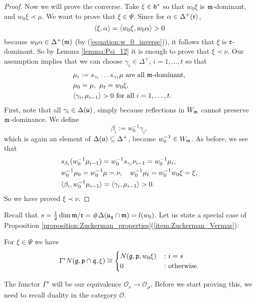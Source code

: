 \documentclass[a4paper,10pt]{article}
\begin{document}
\begin{proof}
Now we will prove the converse. Take $\xi \in \mathfrak{h}^\ast$ so that $w_0 \xi$ is $\mathfrak{m}$-dominant, and $w_0 \xi \prec \mu$. We want to prove that $\xi \in \Psi$. Since for $\alpha \in \Delta^+(\mathfrak{r})$,
%
\[ \langle \xi, \alpha \rangle =  \langle w_0\xi, w_0\alpha \rangle > 0\]
%
because $w_0\alpha \in \Delta^+(\mathfrak{m})$ (by (\ref{equation:w_0_inverse})), it follows that $\xi$ is $\mathfrak{r}$-dominant. So by Lemma \ref{lemma:Psi_12} it is enough to prove that $\xi \prec \nu$. Our assumption implies that we can choose $\gamma_i \in \Delta^+$, $i=1,\ldots,t$ so that
%
\begin{align*} & \mu_i:= s_{\gamma_i} \ldots s_{\gamma_1} \mu \text{ are all $\mathfrak{m}$-dominant}, \\
& \mu_0=\mu, \ \mu_t=w_0\xi, \\
& \langle \gamma_i, \mu_{i-1} \rangle>0 \text{ for all $i=1,\ldots,t$}.
\end{align*}
%
First, note that all $\gamma_i \in \Delta(\mathfrak{u})$, simply because reflections in $W_{\mathfrak{m}}$ cannot preserve $\mathfrak{m}$-dominance. We define
%
\[ \beta_i := w_0^{-1} \gamma_i, \]
%
which is again an element of $\Delta(\mathfrak{u}) \subseteq \Delta ^+$, because $w_0^{-1} \in W_{\mathfrak{m}}$. As before, we see that
%
\begin{align*} & s_{\beta_i} (w_0^{-1} \mu_{i-1}) = w_0^{-1} s_{\gamma_i} \nu_{i-1} = w_0^{-1} \mu_i , \\
& w_0^{-1} \mu_0 = w_0^{-1} \mu = \nu, \quad w_0^{-1} \mu_t =  w_0^{-1} w_0 \xi = \xi, \\
& \langle \beta_i, w_0^{-1} \mu_{i-1} \rangle = \langle \gamma_i, \mu_{i-1} \rangle >0. 
\end{align*}
%
So we have proved $\xi \prec \nu$.
\end{proof}

Recall that $s=\frac{1}{2}\dim \mathfrak{m/r} = \#\Delta(\mathfrak{u_q \cap m})=l(w_0)$. Let us state a special case of Proposition \ref{proposition:Zuckerman_properties}(\ref{item:Zuckerman_Vermas}):
%
\begin{lemma}
\label{lemma:Gamma_Vermas_s}
For $\xi \in \Psi$ we have
%
\[ \Gamma^i N(\mathfrak{g,p\cap q},\xi) \cong \begin{cases} N(\mathfrak{g,p},w_0\xi) &\colon i=s  \\ 0 &\colon \text{otherwise}. \end{cases} \]
\end{lemma}
%
The functor $\Gamma^s$ will be our equivalence $\mathcal{O}_\nu \to \mathcal{O}_\mu$. Before we start proving this, we need to recall duality in the category $\mathcal{O}$.
\end{document}
